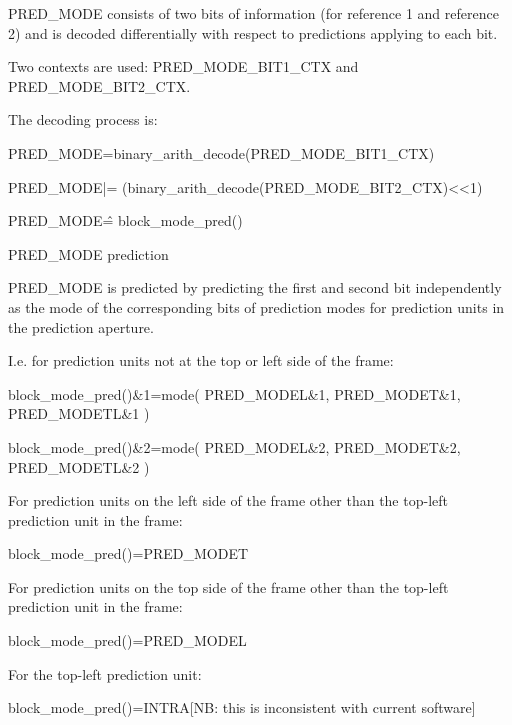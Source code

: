 PRED\_MODE consists of two bits of information (for reference 1 and
reference 2) and is decoded differentially with respect to predictions
applying to each bit.

Two contexts are used: PRED\_MODE\_BIT1\_CTX and PRED\_MODE\_BIT2\_CTX. 

The decoding process is:

PRED\_MODE=binary\_arith\_decode(PRED\_MODE\_BIT1\_CTX)

PRED\_MODE|= (binary\_arith\_decode(PRED\_MODE\_BIT2\_CTX)<<1)

PRED\_MODE\^= block\_mode\_pred()

PRED\_MODE prediction

PRED\_MODE is predicted by predicting the first and second bit
independently as the mode of the corresponding bits of prediction modes
for prediction units in the prediction aperture.

I.e. for prediction units not at the top or left side of the frame:

block\_mode\_pred()\&1=mode( PRED\_MODEL\&1, PRED\_MODET\&1, PRED\_MODETL\&1 )

block\_mode\_pred()\&2=mode( PRED\_MODEL\&2, PRED\_MODET\&2, PRED\_MODETL\&2 )

For prediction units on the left side of the frame other than the
top-left prediction unit in the frame:

block\_mode\_pred()=PRED\_MODET

For prediction units on the top side of the frame other than the
top-left prediction unit in the frame:

block\_mode\_pred()=PRED\_MODEL

For the top-left prediction unit:

block\_mode\_pred()=INTRA[NB: this is inconsistent with current software]

